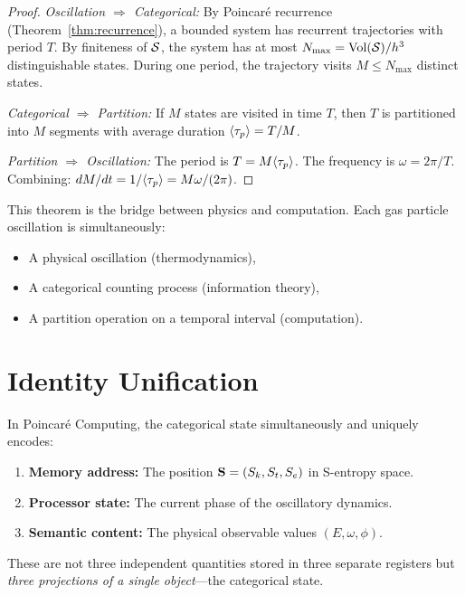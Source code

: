 \begin{proof}
\emph{Oscillation $\Rightarrow$ Categorical:} By Poincar\'{e} recurrence (Theorem~\ref{thm:recurrence}), a bounded system has recurrent trajectories with period $T$. By finiteness of $\mathcal{S}$, the system has at most $N_{\max} = \mathrm{Vol}(\mathcal{S})/h^3$ distinguishable states. During one period, the trajectory visits $M \leq N_{\max}$ distinct states.

\emph{Categorical $\Rightarrow$ Partition:} If $M$ states are visited in time $T$, then $T$ is partitioned into $M$ segments with average duration $\langle\tau_p\rangle = T/M$.

\emph{Partition $\Rightarrow$ Oscillation:} The period is $T = M\langle\tau_p\rangle$. The frequency is $\omega = 2\pi/T$. Combining: $dM/dt = 1/\langle\tau_p\rangle = M\omega/(2\pi)$.
\end{proof}

This theorem is the bridge between physics and computation. Each gas particle oscillation is simultaneously:
\begin{itemize}
    \item A physical oscillation (thermodynamics),
    \item A categorical counting process (information theory),
    \item A partition operation on a temporal interval (computation).
\end{itemize}

\section{Identity Unification}
\label{sec:identity}

\begin{theorem}
\label{thm:identity}
In Poincar\'{e} Computing, the categorical state simultaneously and uniquely encodes:
\begin{enumerate}
    \item \textbf{Memory address:} The position $\mathbf{S} = (S_k, S_t, S_e)$ in S-entropy space.
    \item \textbf{Processor state:} The current phase of the oscillatory dynamics.
    \item \textbf{Semantic content:} The physical observable values $(E, \omega, \phi)$.
\end{enumerate}
These are not three independent quantities stored in three separate registers but \emph{three projections of a single object}---the categorical state.
\end{theorem}

